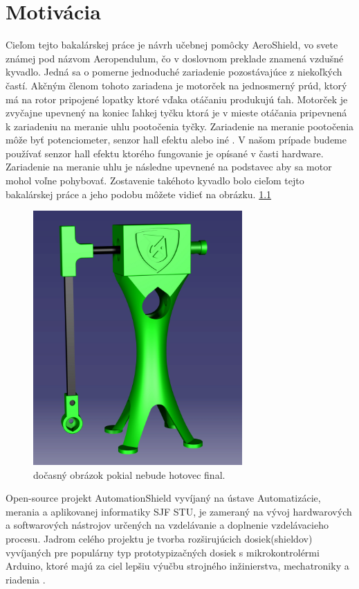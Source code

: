 \chapter{Motivácia}

Cieľom tejto bakalárskej práce je návrh učebnej pomôcky AeroShield, vo svete známej pod názvom Aeropendulum, čo v doslovnom preklade znamená vzdušné kyvadlo. Jedná sa o pomerne jednoduché zariadenie pozostávajúce z niekoľkých častí. Akčným členom tohoto zariadena je  motorček na jednosmerný prúd, ktorý má na rotor pripojené lopatky ktoré vďaka otáčaniu produkujú ťah. Motorček je zvyčajne upevnený na koniec ľahkej tyčku ktorá je v mieste otáčania pripevnená k zariadeniu na meranie uhlu pootočenia tyčky. Zariadenie na meranie pootočenia môže byť potenciometer, senzor hall efektu alebo iné \cite{senzor}. V našom prípade budeme používať senzor hall efektu ktorého fungovanie je opísané v časti hardware. Zariadenie na meranie uhlu je následne upevnené na podstavec aby sa motor mohol voľne pohybovať. Zostavenie takéhoto kyvadlo bolo cieľom tejto bakalárskej práce a jeho podobu môžete vidieť na obrázku. \ref{OBRAZOK 1.1}

\begin{figure}[!tbh]
\centering
\includegraphics[width=80mm]{obr/pendulum.png}
\caption{dočasný obrázok pokial nebude hotovec final.}\label{OBRAZOK 1.1}
\end{figure}

Open-source projekt AutomationShield vyvíjaný na ústave Automatizácie, merania a aplikovanej informatiky SJF STU, je zameraný na vývoj hardwarových a softwarových nástrojov určených na vzdelávanie a doplnenie vzdelávacieho procesu. Jadrom celého projektu je tvorba rozširujúcich dosiek(shieldov) vyvíjaných pre populárny typ prototypizačných dosiek s mikrokontrolérmi Arduino, ktoré majú za ciel lepšiu výučbu strojného inžinierstva, mechatroniky a riadenia \cite{Auto}.

